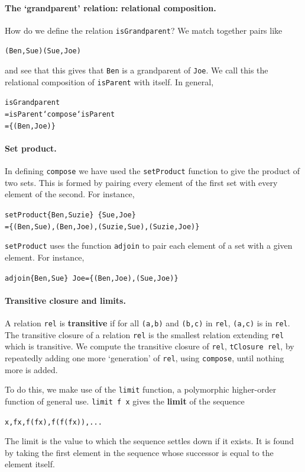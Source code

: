 \paragraph{The `grandparent' relation: relational composition.}
How do
we define the relation \texttt{isGrandparent}? We match together pairs like
\begin{alltt}
(Ben,Sue)    (Sue,Joe)
\end{alltt}
and see that this gives that \texttt{Ben} is a grandparent of \texttt{Joe}. We call
this the relational composition
of \texttt{isParent} with itself. In general,
\begin{alltt}
isGrandparent 
  = isParent `compose` isParent
  = \{(Ben,Joe)\}
\end{alltt}

\paragraph{Set product.}
In defining \texttt{compose}
we have used the \texttt{setProduct} function to give the product of
two sets. This is formed by pairing every element of the first set with every
element of the second. For instance,
\begin{alltt}
setProduct \{Ben,Suzie\}\ \{Sue,Joe\} 
  = \{ (Ben,Sue) , (Ben,Joe) , (Suzie,Sue) , (Suzie,Joe) \} 
\end{alltt}
\texttt{setProduct} uses the function \texttt{adjoin} to pair each element of a set
with a given element. For instance,
\begin{alltt}
adjoin \{Ben,Sue\}\ Joe = \{ (Ben,Joe) , (Sue,Joe) \} 
\end{alltt}

\paragraph{Transitive closure and limits.}
A relation \texttt{rel} is \textbf{transitive} if for all 
\texttt{(a,b)} and \texttt{(b,c)} in \texttt{rel}, \texttt{(a,c)} is in \texttt{rel}.
The transitive closure of a relation \texttt{rel} is the
smallest relation extending \texttt{rel} which is transitive. We compute the
transitive closure of \texttt{rel}, \texttt{tClosure rel}, by repeatedly adding one
more `generation' of \texttt{rel}, using \texttt{compose}, until nothing more is
added.

To do this, we make use of the \texttt{limit} function,
 a polymorphic higher-order function of
general use. \texttt{limit f x} gives the \textbf{limit} of the sequence
\begin{alltt}
x , f x , f (f x) , f (f (f x)) , ...
\end{alltt}
The
limit is the value to which the sequence settles down if it exists. It is
found by taking the first element in the sequence whose successor is equal
to the element itself.  
 
